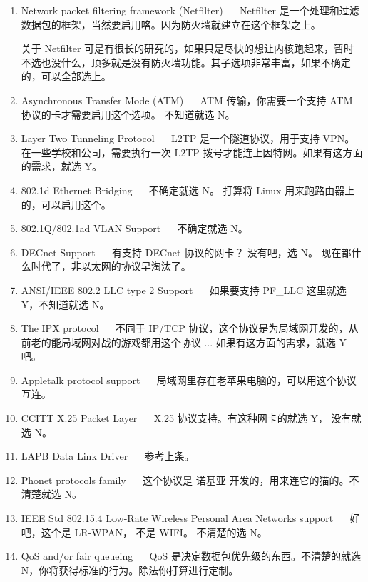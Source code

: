 \begin{enumerate}
\begin{enumerate}
\item Network packet filtering framework (Netfilter) ~~ Netfilter 是一个处理和过滤数据包的框架，当然要启用咯。因为防火墙就建立在这个框架之上。

关于 Netfilter 可是有很长的研究的，如果只是尽快的想让内核跑起来，暂时不选也没什么，顶多就是没有防火墙功能。其子选项非常丰富，如果不确定的，可以全部选上。

\item Asynchronous Transfer Mode (ATM) ~~  ATM 传输，你需要一个支持 ATM 协议的卡才需要启用这个选项。 不知道就选 N。 

\item Layer Two Tunneling Protocol ~~ L2TP 是一个隧道协议，用于支持 VPN。 在一些学校和公司，需要执行一次 L2TP  拨号才能连上因特网。如果有这方面的需求，就选 Y。

\item 802.1d Ethernet Bridging ~~ 不确定就选 N。 打算将 Linux 用来跑路由器上的，可以启用这个。

\item 802.1Q/802.1ad VLAN Support ~~ 不确定就选 N。

\item DECnet Support ~~ 有支持 DECnet 协议的网卡？ 没有吧，选 N。 现在都什么时代了，非以太网的协议早淘汰了。

\item ANSI/IEEE 802.2 LLC type 2 Support ~~ 如果要支持 PF\_LLC 这里就选 Y，不知道就选 N。

\item The IPX protocol ~~ 不同于 IP/TCP 协议，这个协议是为局域网开发的，从前老的能局域网对战的游戏都用这个协议 ... 如果有这方面的需求，就选 Y 吧。

\item Appletalk protocol support ~~ 局域网里存在老苹果电脑的，可以用这个协议互连。

\item CCITT X.25 Packet Layer ~~  X.25 协议支持。有这种网卡的就选 Y， 没有就选 N。 
\item LAPB Data Link Driver ~~ 参考上条。

\item Phonet protocols family ~~ 这个协议是 诺基亚 开发的，用来连它的猫的。不清楚就选 N。

\item IEEE Std 802.15.4 Low-Rate Wireless Personal Area Networks support ~~ 好吧，这个是 LR-WPAN， 不是 WIFI。 不清楚的选 N。

\item QoS and/or fair queueing ~~ QoS 是决定数据包优先级的东西。不清楚的就选 N，你将获得标准的行为。除法你打算进行定制。


\end{enumerate}
\end{enumerate}
